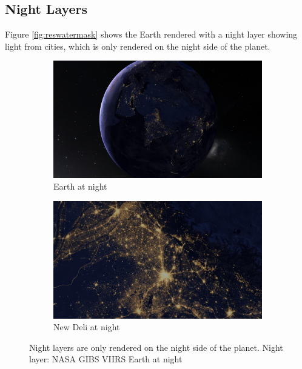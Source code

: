 \clearpage
\subsection{Night Layers}
\FloatBarrier
Figure \ref{fig:reswatermask} shows the Earth rendered with a night layer showing light from cities, which is only rendered on the night side of the planet. 

\begin{figure}[h]
    \centering
    \begin{subfigure}[bt]{0.8\textwidth}
        \includegraphics[width=\textwidth]{figures/results/screenshots/night_earth.png}
        \caption{Earth at night}
    \end{subfigure}
    \par\bigskip
    \begin{subfigure}[bt]{0.8\textwidth}
        \includegraphics[width=\textwidth]{figures/results/screenshots/night_new_deli.png}
        \caption{New Deli at night}
    \end{subfigure}
    \caption{Night layers are only rendered on the night side of the planet. Night layer: NASA GIBS VIIRS Earth at night \cite{gibs}}
\end{figure}

